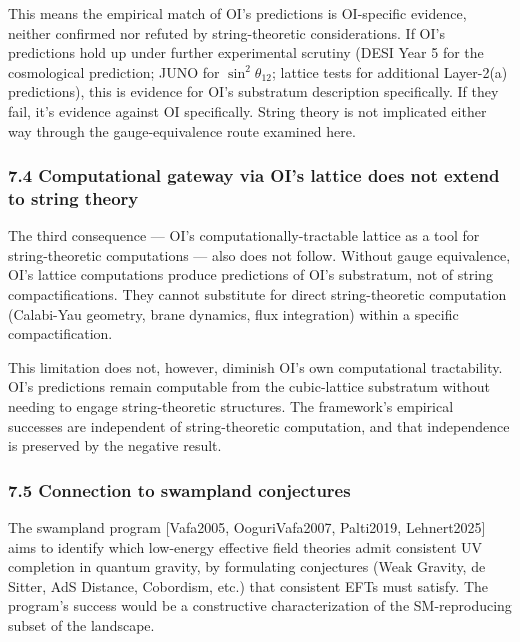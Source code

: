 \documentclass[
]{article}
\begin{document}
This means the empirical match of OI's predictions is OI-specific
evidence, neither confirmed nor refuted by string-theoretic
considerations. If OI's predictions hold up under further experimental
scrutiny (DESI Year 5 for the cosmological prediction; JUNO for
\(\sin^2\theta_{12}\); lattice tests for additional Layer-2(a)
predictions), this is evidence for OI's substratum description
specifically. If they fail, it's evidence against OI specifically.
String theory is not implicated either way through the gauge-equivalence
route examined here.

\hypertarget{computational-gateway-via-ois-lattice-does-not-extend-to-string-theory}{%
\subsubsection{7.4 Computational gateway via OI's lattice does not
extend to string
theory}\label{computational-gateway-via-ois-lattice-does-not-extend-to-string-theory}}

The third consequence --- OI's computationally-tractable lattice as a
tool for string-theoretic computations --- also does not follow. Without
gauge equivalence, OI's lattice computations produce predictions of OI's
substratum, not of string compactifications. They cannot substitute for
direct string-theoretic computation (Calabi-Yau geometry, brane
dynamics, flux integration) within a specific compactification.

This limitation does not, however, diminish OI's own computational
tractability. OI's predictions remain computable from the cubic-lattice
substratum without needing to engage string-theoretic structures. The
framework's empirical successes are independent of string-theoretic
computation, and that independence is preserved by the negative result.

\hypertarget{connection-to-swampland-conjectures}{%
\subsubsection{7.5 Connection to swampland
conjectures}\label{connection-to-swampland-conjectures}}

The swampland program {[}Vafa2005, OoguriVafa2007, Palti2019,
Lehnert2025{]} aims to identify which low-energy effective field
theories admit consistent UV completion in quantum gravity, by
formulating conjectures (Weak Gravity, de Sitter, AdS Distance,
Cobordism, etc.) that consistent EFTs must satisfy. The program's
success would be a constructive characterization of the SM-reproducing
subset of the landscape.
\end{document}
